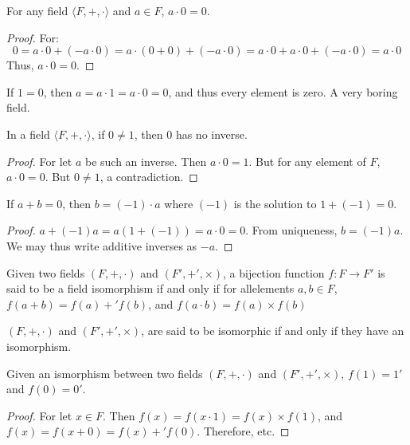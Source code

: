     \begin{theorem}
        For any field $\langle{F},+,\cdot\rangle$ and $a\in{F}$, $a\cdot{0}=0$.
    \end{theorem}
    \begin{proof}
        For:
        \begin{equation}
            0=a\cdot{0}+(\minus{a}\cdot{0})
             =a\cdot(0+0)+(\minus{a}\cdot{0})
             =a\cdot{0}+a\cdot{0}+(\minus{a}\cdot{0})
             =a\cdot 0
        \end{equation}
        Thus, $a\cdot{0}=0$.
    \end{proof}
    If $1=0$, then $a=a\cdot{1}=a\cdot{0}=0$, and thus every element is
    zero. A very boring field.
    \begin{theorem}
        In a field $\langle F, +,\cdot \rangle$, if $0\ne 1$, then $0$ has no
        inverse.
    \end{theorem}
    \begin{proof}
        For let $a$ be such an inverse. Then $a\cdot{0}=1$. But for any element
        of $F$, $a\cdot{0}=0$. But $0\ne{1}$, a contradiction.
    \end{proof}
    \begin{theorem}
        If $a+b=0$, then $b=(\minus{1})\cdot{a}$ where $(\minus{1})$ is the
        solution to $1+(\minus{1})=0$.
    \end{theorem}
    \begin{proof}
        $a+(\minus{1})a=a(1+(\minus{1}))=a\cdot{0}=0$. From uniqueness,
        $b=(\minus{1})a$. We may thus write additive inverses as $\minus{a}$.
    \end{proof}
    \begin{definition}
        Given two fields $(F,+,\cdot)$ and $(F',+',\times)$, a bijection
        function $f:F\rightarrow{F}'$ is said to be a field isomorphism if and
        only if for allelements $a,b\in{F}$, $f(a+b)=f(a)+'f(b)$, and
        $f(a\cdot{b})=f(a)\times{f}(b)$
    \end{definition}
    \begin{definition}
        $(F,+,\cdot)$ and $(F',+',\times)$, are said to be isomorphic if and
        only if they have an isomorphism.
    \end{definition}
    \begin{theorem}
        Given an ismorphism between two fields $(F,+,\cdot)$ and
        $(F', +',\times)$, $f(1)=1'$ and $f(0)=0'$.
    \end{theorem}
    \begin{proof}
        For let $x\in{F}$. Then $f(x)=f(x\cdot 1)=f(x)\times{f}(1)$, and
        $f(x)=f(x+0)=f(x)+'f(0)$. Therefore, etc.
    \end{proof}

